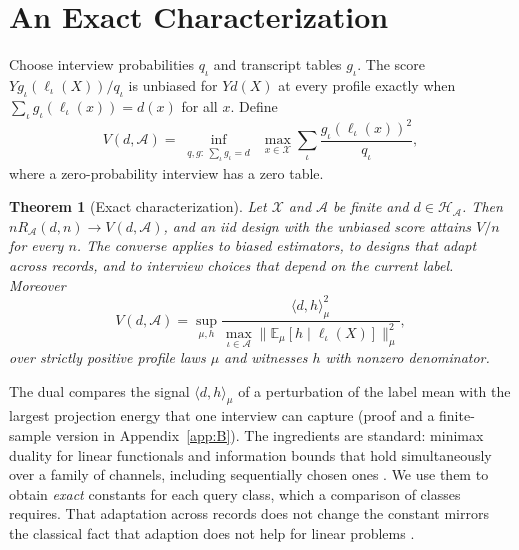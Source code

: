 \documentclass{article}
\newtheorem{theorem}{Theorem}
\newcommand{\E}{\mathbb{E}}
\newcommand{\X}{\mathcal X}
\newcommand{\A}{\mathcal A}
\newcommand{\Hh}{\mathcal H}
\begin{document}
\section{An Exact Characterization}\label{sec:general}
Choose interview probabilities $q_\iota$ and transcript tables $g_\iota$. The score $Yg_\iota(\ell_\iota(X))/q_\iota$ is unbiased for $Yd(X)$ at every profile exactly when $\sum_\iota g_\iota(\ell_\iota(x))=d(x)$ for all $x$. Define
\begin{equation}
 V(d,\A)=\inf_{\substack{q,g:\ \sum_\iota g_\iota=d}}\ \max_{x\in\X}
             \sum_\iota\frac{g_\iota(\ell_\iota(x))^2}{q_\iota},\label{eq:unbiasedprogram}
\end{equation}
where a zero-probability interview has a zero table.

\begin{theorem}[Exact characterization]\label{thm:char}
Let $\X$ and $\A$ be finite and $d\in\Hh_\A$. Then $nR_\A(d,n)\to V(d,\A)$, and an iid design with the unbiased score attains $V/n$ for every $n$. The converse applies to biased estimators, to designs that adapt across records, and to interview choices that depend on the current label. Moreover
\[
 V(d,\A)=\sup_{\mu,h}\frac{\langle d,h\rangle_\mu^2}{\max_{\iota\in\A}\|\E_\mu[h\mid\ell_\iota(X)]\|_\mu^2},
\]
over strictly positive profile laws $\mu$ and witnesses $h$ with nonzero denominator.
\end{theorem}
The dual compares the signal $\langle d,h\rangle_\mu$ of a perturbation of the label mean with the largest projection energy that one interview can capture (proof and a finite-sample version in Appendix~\ref{app:B}). The ingredients are standard: minimax duality for linear functionals \citep{donoho1994,juditsky2009,polyanskiy2026} and information bounds that hold simultaneously over a family of channels, including sequentially chosen ones \citep{acharya2019,barnes2020}. We use them to obtain \emph{exact} constants for each query class, which a comparison of classes requires. That adaptation across records does not change the constant mirrors the classical fact that adaption does not help for linear problems \citep{bakhvalov1971,novak1996}.
\end{document}
